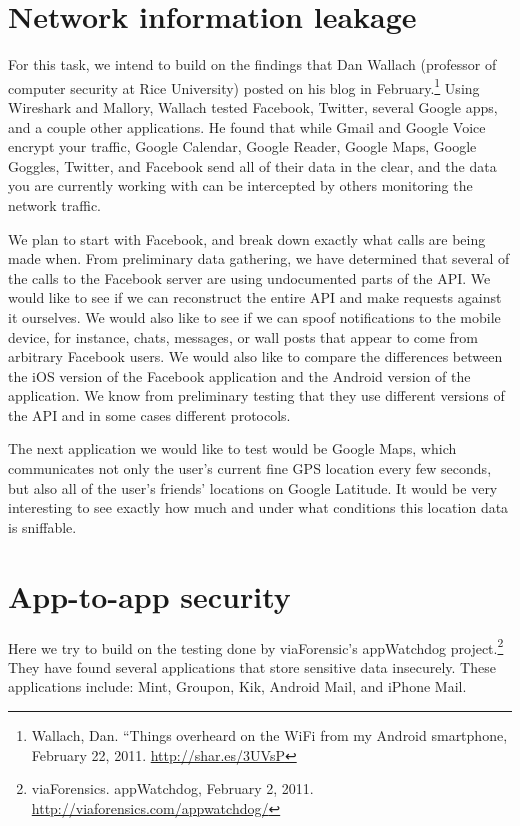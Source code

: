 \documentclass[11pt]{article}
\begin{document}
\section{Network information leakage}
For this task, we intend to build on the findings that Dan Wallach (professor
of computer security at Rice University) posted on his blog in
February.\footnote{Wallach, Dan. ``Things overheard on the WiFi from my Android
smartphone, February 22, 2011. \url{http://shar.es/3UVsP}} Using Wireshark and
Mallory, Wallach tested Facebook, Twitter, several Google apps, and a couple
other applications. He found that while Gmail and Google Voice encrypt your
traffic, Google Calendar, Google Reader, Google Maps, Google Goggles, Twitter,
and Facebook send all of their data in the clear, and the data you are
currently working with can be intercepted by others monitoring the network
traffic.

We plan to start with Facebook, and break down exactly what calls are being
made when. From preliminary data gathering, we have determined that several of
the calls to the Facebook server are using undocumented parts of the API. We
would like to see if we can reconstruct the entire API and make requests
against it ourselves. We would also like to see if we can spoof notifications
to the mobile device, for instance, chats, messages, or wall posts that appear
to come from arbitrary Facebook users. We would also like to compare the
differences between the iOS version of the Facebook application and the Android
version of the application. We know from preliminary testing that they use
different versions of the API and in some cases different protocols.

The next application we would like to test would be Google Maps, which
communicates not only the user's current fine GPS location every few seconds,
but also all of the user's friends' locations on Google Latitude. It would be
very interesting to see exactly how much and under what conditions this
location data is sniffable.

\section{App-to-app security}
Here we try to build on the testing done by viaForensic's appWatchdog
project.\footnote{viaForensics. appWatchdog, February 2, 2011.
\url{http://viaforensics.com/appwatchdog/}} They have found several
applications that store sensitive data insecurely. These applications include:
Mint, Groupon, Kik, Android Mail, and iPhone Mail.
\end{document}
